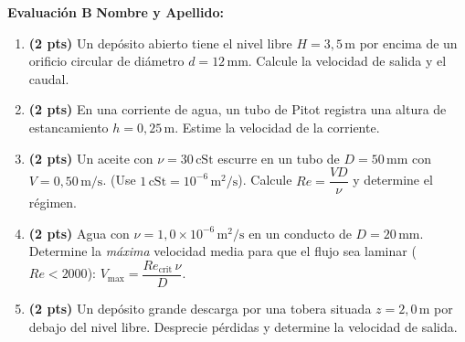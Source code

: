 \documentclass[a4paper,11pt]{article}
\begin{document}
\begin{minipage}[t]{0.48\textwidth}
    \textbf{Evaluación B} \hfill \textbf{Nombre y Apellido: \underline{\hspace{4cm}}}

    \vspace{0.2cm}
    \begin{enumerate}
        \item \textbf{(2 pts)} Un depósito abierto tiene el nivel libre $H=3{,}5\,\mathrm{m}$ por encima de un orificio circular de diámetro $d=12\,\mathrm{mm}$. Calcule la velocidad de salida y el caudal.
        \item \textbf{(2 pts)} En una corriente de agua, un tubo de Pitot registra una altura de estancamiento $h=0{,}25\,\mathrm{m}$. Estime la velocidad de la corriente.
        \item \textbf{(2 pts)} Un aceite con $\nu=30\,\mathrm{cSt}$ escurre en un tubo de $D=50\,\mathrm{mm}$ con $V=0{,}50\,\mathrm{m/s}$. (Use $1\,\mathrm{cSt}=10^{-6}\,\mathrm{m^2/s}$). Calcule \(Re=\dfrac{VD}{\nu}\) y determine el régimen.
        \item \textbf{(2 pts)} Agua con $\nu=1{,}0\times10^{-6}\,\mathrm{m^2/s}$ en un conducto de $D=20\,\mathrm{mm}$. Determine la \emph{máxima} velocidad media para que el flujo sea laminar (\(Re<2000\)): \(V_{\max}=\dfrac{Re_\text{crit}\,\nu}{D}\).
        \item \textbf{(2 pts)} Un depósito grande descarga por una tobera situada $z=2{,}0\,\mathrm{m}$ por debajo del nivel libre. Desprecie pérdidas y determine la velocidad de salida.
    \end{enumerate}
\end{minipage}

\vspace{0.6cm}
\end{document}
